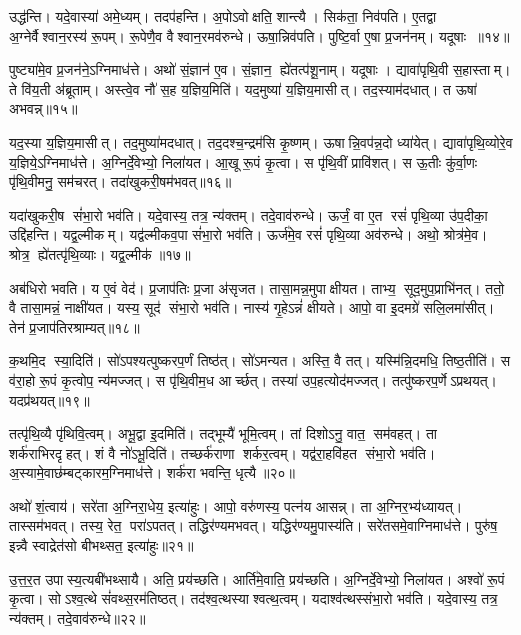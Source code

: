 उद्ध॑न्ति। यदे॒वास्या॑ अमे॒ध्यम्। तदप॑हन्ति। अ॒पोऽवोक्षति॒ शान्त्यै। सिक॑ता॒ निव॑पति। ए॒तद्वा अ॒ग्नेर्वैश्वान॒रस्य॑ रू॒पम्। रू॒पेणै॒व वैश्वान॒रमव॑रुन्धे। ऊषा॒न्निव॑पति। पुष्टि॒र्वा ए॒षा प्र॒जन॑नम्। यदूषाः ॥१४॥

पुष्ट्या॑मे॒व प्र॒जन॑ने॒ऽग्निमाध॑त्ते। अथो॑ सं॒ज्ञान॑ ए॒व। सं॒ज्ञान॒ ह्ये॑तत्प॑शू॒नाम्। यदूषाः। द्यावा॑पृथि॒वी स॒हास्ताम्। ते वि॑य॒ती अ॑ब्रूताम्। अस्त्वे॒व नौ॑ स॒ह य॒ज्ञिय॒मिति॑। यद॒मुष्या॑ य॒ज्ञिय॒मासीत्। तद॒स्याम॑दधात्। त ऊषा॑ अभवन्न्॥१५॥

यद॒स्या य॒ज्ञिय॒मासीत्। तद॒मुष्या॑मदधात्। तद॒दश्च॒न्द्रम॑सि कृ॒ष्णम्। ऊषान्नि॒वप॑न्न॒दो ध्या॑येत्। द्यावा॑पृथि॒व्योरे॒व य॒ज्ञिये॒ऽग्निमाध॑त्ते। अ॒ग्निर्दे॒वेभ्यो॒ निला॑यत। आ॒खू रू॒पं कृ॒त्वा। स पृ॑थि॒वीं प्रावि॑शत्। स ऊ॒तीः कु॑र्वा॒णः पृ॑थि॒वीमनु॒ सम॑चरत्। तदा॑खुकरी॒षम॑भवत्॥१६॥

यदा॑खुकरी॒ष सं॑भा॒रो भव॑ति। यदे॒वास्य॒ तत्र॒ न्य॑क्तम्। तदे॒वाव॑रुन्धे। ऊर्जं॒ वा ए॒त रसं॑ पृथि॒व्या उ॑प॒दीका॒ उद्दि॑हन्ति। यद्व॒ल्मीकम्। यद्व॑ल्मीकव॒पा सं॑भा॒रो भव॑ति। ऊर्ज॑मे॒व रसं॑ पृथि॒व्या अव॑रुन्धे। अथो॒ श्रोत्र॑मे॒व। श्रोत्र॒ ह्ये॑तत्पृ॑थि॒व्याः। यद्व॒ल्मीक॑॥१७॥

अब॑धिरो भवति। य ए॒वं वेद॑। प्र॒जाप॑तिः प्र॒जा अ॑सृजत। तासा॒मन्न॒मुपाक्षीयत। ताभ्य॒ सूद॒मुप॒प्राभि॑नत्। ततो॒ वै तासा॒मन्नं॒ नाक्षी॑यत। यस्य॒ सूद॑ संभा॒रो भव॑ति। नास्य॑ गृ॒हेऽन्नं॑ क्षीयते। आपो॒ वा इ॒दमग्रे॑ सलि॒लमा॑सीत्। तेन॑ प्र॒जाप॑तिरश्राम्यत्॥१८॥

क॒थमि॒द स्या॒दिति॑। सो॑ऽपश्यत्पुष्करप॒र्णं तिष्ठ॑त्। सो॑ऽमन्यत। अस्ति॒ वै तत्। यस्मि॑न्नि॒दमधि॒ तिष्ठ॒तीति॑। स व॑रा॒हो रू॒पं कृ॒त्वोप॒ न्य॑मज्जत्। स पृ॑थि॒वीम॒ध आर्च्छत्। तस्या॑ उप॒हत्योद॑मज्जत्। तत्पु॑ष्करप॒र्णेऽप्रथयत्। यदप्र॑थयत्॥१९॥

तत्पृ॑थि॒व्यै पृ॑थिवि॒त्वम्। अभू॒द्वा इ॒दमिति॑। तद्भूम्यै॑ भूमि॒त्वम्। तां दिशोऽनु॒ वात॒ सम॑वहत्। ता शर्क॑राभिरदृहत्। शं वै नो॑ऽभू॒दिति॑। तच्छर्क॑राणा शर्कर॒त्वम्। यद्व॑रा॒हवि॑हत संभा॒रो भव॑ति। अ॒स्यामे॒वाछ॑म्बट्कारम॒ग्निमाध॑त्ते। शर्क॑रा भवन्ति॒ धृत्यै॥२०॥

अथो॑ शं॒त्वाय॑। सरे॑ता अ॒ग्निरा॒धेय॒ इत्या॑हुः। आपो॒ वरु॑णस्य॒ पत्न॑य आसन्न्। ता अ॒ग्निर॒भ्य॑ध्यायत्। तास्सम॑भवत्। तस्य॒ रेत॒ परा॑ऽपतत्। तद्धिर॑ण्यमभवत्। यद्धिर॑ण्यमु॒पास्य॑ति। सरे॑तसमे॒वाग्निमाध॑त्ते। पुरु॑ष॒ इन्न्वै स्वाद्रेत॑सो बीभथ्सत॒ इत्या॑हुः॥२१॥

उ॒त्त॒र॒त उपास्य॒त्यबी॑भथ्सायै। अति॒ प्रय॑च्छति। आर्ति॑मे॒वाति॒ प्रय॑च्छति। अ॒ग्निर्दे॒वेभ्यो॒ निला॑यत। अश्वो॑ रू॒पं कृ॒त्वा। सोऽश्व॒त्थे सं॑वथ्स॒रम॑तिष्ठत्। तद॑श्व॒त्थस्याश्वत्थ॒त्वम्। यदाश्व॑त्थस्संभा॒रो भव॑ति। यदे॒वास्य॒ तत्र॒ न्य॑क्तम्। तदे॒वाव॑रुन्धे॥२२॥

